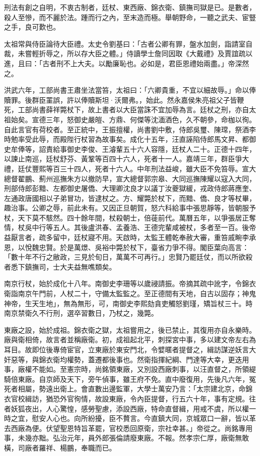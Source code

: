 刑法有創之自明，不衷古制者，廷杖、東西廠、錦衣衛、鎮撫司獄是已。是數者，殺人至慘，而不麗於法。踵而行之內，至末造而極。舉朝野命，一聽之武夫、宦豎之手，良可歎也。

太祖常與侍臣論待大臣禮。太史令劉基曰：「古者公卿有罪，盤水加劍，詣請室自裁，未嘗輕折辱之，所以存大臣之體。」侍讀學士詹同因取《大戴禮》及賈誼疏以進，且曰：「古者刑不上大夫。以勵廉恥也。必如是，君臣恩禮始兩盡。」帝深然之。

洪武六年，工部尚書王肅坐法當笞，太祖曰：「六卿貴重，不宜以細故辱。」命以俸贖罪。後群臣罣誤，許以俸贖斯坦·沃爾弗。，始此。然永嘉侯朱亮祖父子皆鞭死，工部尚書薛祥斃杖下，故上書者以大臣當誅不宜加辱為言。廷杖之刑，亦自太祖始矣。宣德三年，怒御史嚴皚、方鼎、何傑等沈湎酒色，久不朝參，命枷以徇。自此言官有荷校者。至正統中，王振擅權，尚書劉中敷，侍郎吳璽、陳瑺，祭酒李時勉率受此辱，而殿陛行杖習為故事矣。成化十五年，汪直誣陷侍郎馬文昇、都御史牟俸等，詔責給事御史李俊、王濬輩五十六人容隱，廷杖人二十。正德十四年，以諫止南巡，廷杖舒芬、黃鞏等百四十六人，死者十一人。嘉靖三年，群臣爭大禮，廷仗豐熙等百三十四人，死者十六人。中年刑法益峻，雖大臣不免笞辱。宣大總督翟鵬、薊州巡撫朱方以撤防早，宣大總督郭宗皋、大同巡撫陳耀以寇入大同，刑部侍郎彭黯、左都御史屠僑、大理卿沈良才以議丁汝夔獄緩，戎政侍郎蔣應奎、左通政唐國相以子弟冒功，皆逮杖之。方、耀斃於杖下，而黯、僑、良才等杖畢，趣治事。公卿之辱，前此未有。又因正旦朝賀，怒六科給事中張思靜等，皆朝服予杖，天下莫不駭然。四十餘年間，杖殺朝士，倍蓰前代。萬曆五年，以爭張居正奪情，杖吳中行等五人。其後盧洪春、孟養浩、王德完輩咸被杖，多者至一百。後帝益厭言者，疏多留中，廷杖寢不用。天啟時，太監王體乾奉赦大審，重笞戚畹李承恩，以悅魏忠賢。於是萬燝、吳裕中斃於杖下，臺省力爭不得。閣臣葉向高言：「數十年不行之敝政，三見於旬日，萬萬不可再行。」忠賢乃罷廷仗，而以所欲殺者悉下鎮撫司，士大夫益無噍類矣。

南京行杖，始於成化十八年。南御史李珊等以歲祲請振。帝摘其疏中訛字，令錦衣衛詣南京午門前，人杖二十，守備太監監之。至正德間有天地，自古以固存；神鬼神帝，生天生地」，無為無形，可，南御史李熙劾貪吏觸怒劉瑾，矯旨杖三十。時南京禁衛久不行刑，選卒習數日，乃杖之，幾斃。

東廠之設，始於成祖。錦衣衛之獄，太祖嘗用之，後已禁止，其復用亦自永樂時。廠與衛相倚，故言者並稱廠衛。初，成祖起北平，刺探宮中事，多以建文帝左右為耳目。故即位後專倚宦官，立東廠於東安門北，令嬖暱者提督之，緝訪謀逆妖言大奸惡等，與錦衣衛均權勢，蓋遷都後事也。然衛指揮紀綱、門達等大幸，更迭用事，廠權不能如。至憲宗時，尚銘領東廠，又別設西廠刺事，以汪直督之，所領緹騎倍東廠。自京師及天下，旁午偵事，雖王府不免。直中廢復用，先後凡六年，冤死者相屬，勢遠出衛上。會直數出邊監軍，大學士萬安乃言：「太宗建北京，命錦衣官校緝訪，猶恐外官徇情，故設東廠，令內臣提督，行五六十年，事有定規。往者妖狐夜出，人心驚惶，感勞聖慮，添設西廠，特命直督緝，用戒不虞，所以權一時之宜，慰安人心也。向所紛擾，臣不贅言。今直鎮大同，京城眾口一辭，皆以革去西廠為便。伏望聖恩特旨革罷，官校悉回原衛，宗社幸甚。」帝從之。尚銘專用事，未幾亦黜。弘治元年，員外郎張倫請廢東廠。不報。然孝宗仁厚，廠衛無敢橫，司廠者羅祥、楊鵬，奉職而已。

